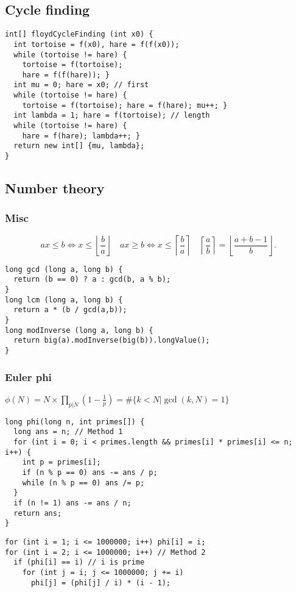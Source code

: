 \subsection{Cycle finding}
\begin{lstlisting}
int[] floydCycleFinding (int x0) {
  int tortoise = f(x0), hare = f(f(x0));
  while (tortoise != hare) {
    tortoise = f(tortoise);
    hare = f(f(hare)); }
  int mu = 0; hare = x0; // first
  while (tortoise != hare) {
    tortoise = f(tortoise); hare = f(hare); mu++; }
  int lambda = 1; hare = f(tortoise); // length
  while (tortoise != hare) {
    hare = f(hare); lambda++; }
  return new int[] {mu, lambda};
}
\end{lstlisting}
\subsection{Number theory}
\subsubsection{Misc}
\[
  ax \leq b \Leftrightarrow x \leq \left\lfloor \frac{b}{a} \right\rfloor \quad
  ax \geq b \Leftrightarrow x \leq \left\lceil \frac{b}{a} \right\rceil \quad
  \left\lceil \frac{a}{b} \right\rceil = \left\lfloor \frac{a+b-1}{b} \right\rfloor.
\]
\begin{lstlisting}
long gcd (long a, long b) {
  return (b == 0) ? a : gcd(b, a % b);
}
long lcm (long a, long b) {
  return a * (b / gcd(a,b));
}
long modInverse (long a, long b) {
  return big(a).modInverse(big(b)).longValue();
}
\end{lstlisting}
\subsubsection{Euler phi}
$\phi(N) = N \times \prod_{p | N} (1 - \frac{1}{p}) = \#\{k < N | \gcd(k,N) = 1\}$
\begin{lstlisting}
long phi(long n, int primes[]) {
  long ans = n; // Method 1
  for (int i = 0; i < primes.length && primes[i] * primes[i] <= n; i++) {
    int p = primes[i];
    if (n % p == 0) ans -= ans / p;
    while (n % p == 0) ans /= p;
  }
  if (n != 1) ans -= ans / n;
  return ans;
}
\end{lstlisting}
\begin{lstlisting}
for (int i = 1; i <= 1000000; i++) phi[i] = i;
for (int i = 2; i <= 1000000; i++) // Method 2
  if (phi[i] == i) // i is prime
    for (int j = i; j <= 1000000; j += i)
      phi[j] = (phi[j] / i) * (i - 1);
\end{lstlisting}
